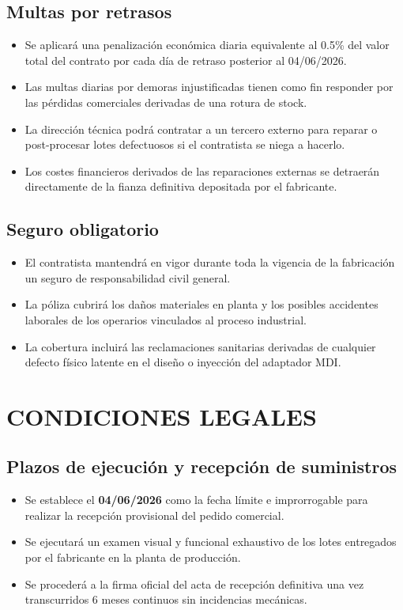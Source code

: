 \documentclass[11pt,a4paper]{article}
\begin{document}
\subsection{Multas por retrasos}
\begin{itemize}
    \item Se aplicará una penalización económica diaria equivalente al 0.5\% del valor total del contrato por cada día de retraso posterior al 04/06/2026.
    \item Las multas diarias por demoras injustificadas tienen como fin responder por las pérdidas comerciales derivadas de una rotura de stock.
    \item La dirección técnica podrá contratar a un tercero externo para reparar o post-procesar lotes defectuosos si el contratista se niega a hacerlo.
    \item Los costes financieros derivados de las reparaciones externas se detraerán directamente de la fianza definitiva depositada por el fabricante.
\end{itemize}

\subsection{Seguro obligatorio}
\begin{itemize}
    \item El contratista mantendrá en vigor durante toda la vigencia de la fabricación un seguro de responsabilidad civil general.
    \item La póliza cubrirá los daños materiales en planta y los posibles accidentes laborales de los operarios vinculados al proceso industrial.
    \item La cobertura incluirá las reclamaciones sanitarias derivadas de cualquier defecto físico latente en el diseño o inyección del adaptador MDI.
\end{itemize}

\section{CONDICIONES LEGALES}

\subsection{Plazos de ejecución y recepción de suministros}
\begin{itemize}
    \item Se establece el \textbf{04/06/2026} como la fecha límite e improrrogable para realizar la recepción provisional del pedido comercial.
    \item Se ejecutará un examen visual y funcional exhaustivo de los lotes entregados por el fabricante en la planta de producción.
    \item Se procederá a la firma oficial del acta de recepción definitiva una vez transcurridos 6 meses continuos sin incidencias mecánicas.
\end{itemize}
\end{document}

